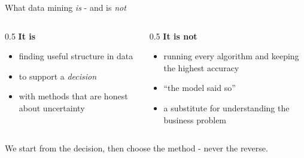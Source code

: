 \documentclass[10pt,aspectratio=169]{beamer}
\begin{document}
\begin{frame}{What data mining \emph{is} - and is \emph{not}}
  \begin{columns}[T]
    \begin{column}{0.5\textwidth}
      \textbf{It is}
      \begin{itemize}\small
        \item finding useful structure in data
        \item to support a \emph{decision}
        \item with methods that are honest about uncertainty
      \end{itemize}
    \end{column}
    \begin{column}{0.5\textwidth}
      \textbf{It is not}
      \begin{itemize}\small
        \item running every algorithm and keeping the highest accuracy
        \item ``the model said so''
        \item a substitute for understanding the business problem
      \end{itemize}
    \end{column}
  \end{columns}
  \vspace{0.8em}
  \begin{center}
    We start from the \alert{decision}, then choose the method - never the reverse.
  \end{center}
\end{frame}
\end{document}

